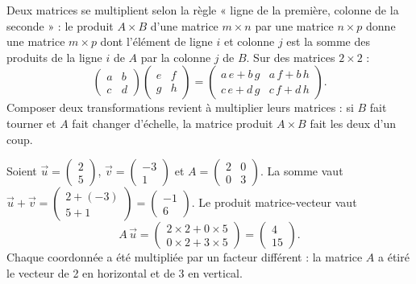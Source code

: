 Deux matrices se multiplient selon la règle « ligne de la première, colonne de la seconde » : le produit $A \times B$ d'une matrice $m \times n$ par une matrice $n \times p$ donne une matrice $m \times p$ dont l'élément de ligne $i$ et colonne $j$ est la somme des produits de la ligne $i$ de $A$ par la colonne $j$ de $B$. Sur des matrices $2 \times 2$ :
\[
\begin{pmatrix} a & b \\ c & d \end{pmatrix}
\begin{pmatrix} e & f \\ g & h \end{pmatrix}
=
\begin{pmatrix} a\,e + b\,g & a\,f + b\,h \\ c\,e + d\,g & c\,f + d\,h \end{pmatrix} .
\]
Composer deux transformations revient à multiplier leurs matrices : si $B$ fait tourner et $A$ fait changer d'échelle, la matrice produit $A \times B$ fait les deux d'un coup.

\begin{exemple}
Soient $\vec{u} = \begin{pmatrix} 2 \\ 5 \end{pmatrix}$, $\vec{v} = \begin{pmatrix} -3 \\ 1 \end{pmatrix}$ et $A = \begin{pmatrix} 2 & 0 \\ 0 & 3 \end{pmatrix}$. La somme vaut $\vec{u} + \vec{v} = \begin{pmatrix} 2 + (-3) \\ 5 + 1 \end{pmatrix} = \begin{pmatrix} -1 \\ 6 \end{pmatrix}$. Le produit matrice-vecteur vaut
\[
A\,\vec{u} = \begin{pmatrix} 2 \times 2 + 0 \times 5 \\ 0 \times 2 + 3 \times 5 \end{pmatrix} = \begin{pmatrix} 4 \\ 15 \end{pmatrix} .
\]
Chaque coordonnée a été multipliée par un facteur différent : la matrice $A$ a étiré le vecteur de 2 en horizontal et de 3 en vertical.
\end{exemple}

